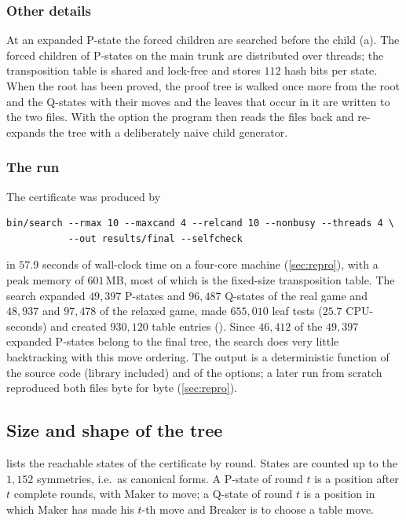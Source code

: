 \subsubsection*{Other details}
At an expanded P-state the forced children are searched before the child (a). The forced children of
P-states on the main trunk are distributed over threads; the transposition table is shared and lock-free
and stores $112$ hash bits per state. When the root has been proved, the proof tree is walked once more
from the root and the Q-states with their moves and the leaves that occur in it are written to the two
files. With the option  the program then reads the files back and re-expands the tree with
a deliberately naive child generator.

\subsubsection*{The run}
The certificate was produced by
\begin{verbatim}
bin/search --rmax 10 --maxcand 4 --relcand 10 --nonbusy --threads 4 \
           --out results/final --selfcheck
\end{verbatim}
in $57.9$ seconds of wall-clock time on a four-core machine (\cref{sec:repro}), with a peak memory of
$601$\,MB, most of which is the fixed-size transposition table. The search expanded $49{,}397$ P-states
and $96{,}487$ Q-states of the real game and $48{,}937$ and $97{,}478$ of the relaxed game, made
$655{,}010$ leaf tests ($25.7$ CPU-seconds) and created $930{,}120$ table entries
(\fn{results/final/stats.json}). Since $46{,}412$ of the $49{,}397$ expanded P-states belong to the final
tree, the search does very little backtracking with this move ordering. The output is a deterministic
function of the source code (library included) and of the options; a later run from scratch reproduced
both files byte for byte (\cref{sec:repro}).

\subsection{Size and shape of the tree}\label{ssec:shape}

 lists the reachable states of the certificate by round. States are counted up to the
$1{,}152$ symmetries, i.e.\ as canonical forms. A P-state of round $t$ is a position after $t$ complete
rounds, with Maker to move; a Q-state of round $t$ is a position in which Maker has made his $t$-th
move and Breaker is to choose a table move.

